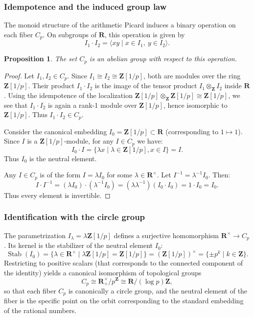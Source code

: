 \documentclass[11pt,a4paper]{article}
\newcommand{\Z}{\mathbf{Z}}
\newcommand{\R}{\mathbf{R}}
\theoremstyle{plain}
\newtheorem{prop}[thm]{Proposition}
\theoremstyle{definition} %
\begin{document}
\subsubsection{Idempotence and the induced group law}

The monoid structure of the arithmetic Picard induces a binary operation on each fiber $C_p$.
On subgroups of $\R$, this operation is given by
\[
I_1 \cdot I_2 = \langle xy \mid x \in I_1,\ y \in I_2 \rangle .
\]

\begin{prop}
The set $C_p$ is an abelian group with respect to this operation.
\end{prop}

\begin{proof}
Let $I_1, I_2 \in C_p$. Since $I_1 \cong I_2 \cong \Z[1/p]$, both are modules over the ring $\Z[1/p]$. Their product $I_1 \cdot I_2$ is the image of the tensor product $I_1 \otimes_\Z I_2$ inside $\R$.
Using the idempotence of the localization $\Z[1/p] \otimes_\Z \Z[1/p] \cong \Z[1/p]$, we see that $I_1 \cdot I_2$ is again a rank-1 module over $\Z[1/p]$, hence isomorphic to $\Z[1/p]$. Thus $I_1 \cdot I_2 \in C_p$.

Consider the canonical embedding $I_0 = \Z[1/p] \subset \R$ (corresponding to $1\mapsto 1$).  Since $I$ is a $\Z[1/p]$-module, for any $I \in C_p$ we have:
\[
I_0 \cdot I = \{ \lambda x \mid \lambda \in \Z[1/p], x \in I \} = I.
\]
Thus $I_0$ is the neutral element.

Any $I \in C_p$ is of the form $I = \lambda I_0$ for some $\lambda \in \R^\times$.
Let $I^{-1} = \lambda^{-1} I_0$. Then:
\[
I \cdot I^{-1} = (\lambda I_0) \cdot (\lambda^{-1} I_0) = (\lambda \lambda^{-1}) (I_0 \cdot I_0) = 1 \cdot I_0 = I_0.
\]
Thus every element is invertible.
\end{proof}



\subsubsection{Identification with the circle group}

The parametrization $I_\lambda = \lambda \Z[1/p]$ defines a surjective homomorphism
$\R^\times \to C_p$.  Its kernel is the stabilizer of the neutral element $I_0$:
\[
\operatorname{Stab}(I_0) = \{ \lambda \in \R^\times \mid \lambda \Z[1/p] = \Z[1/p] \} = (\Z[1/p])^\times = \{ \pm p^k \mid k \in \Z \}.
\]
Restricting to positive scalars (that corresponds to the connected component of the identity) yields a canonical isomorphism of topological groups
\[
C_p \cong \R_+^\times / p^\Z \cong \R / (\log p)\Z ,
\]
so that each fiber $C_p$ is canonically a circle group, and the neutral element of the fiber is the specific point on the orbit corresponding to the standard embedding of the rational numbers.
\end{document}

